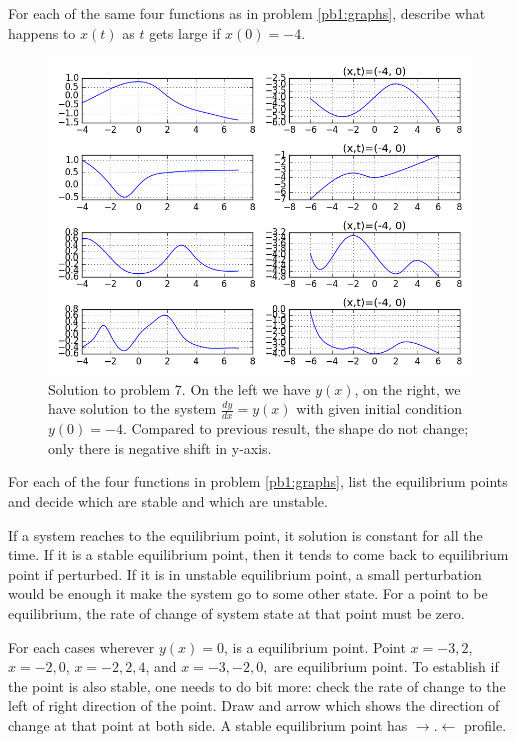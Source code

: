 \begin{questions}
\question[5]
\label{pb2:graphs}

    For each of the same four functions as in problem \ref{pb1:graphs}, describe
    what happens to $x(t)$ as $t$ gets large if $x(0) = -4 $.
    

    \begin{figure}[htpb]
        \centering
        \includegraphics[width=\linewidth]{./solve_problem8_py.png}
        \caption{Solution to problem 7. On the left we have $y(x)$, on the right, we
            have solution to the system $\frac{dy}{dx} = y(x)$  with given initial
            condition $y(0) = -4 $. Compared to previous result, the shape do not
            change; only there is negative shift in y-axis. 
        }
        \label{fig:pb2_graph}
    \end{figure}


\question[5]
For each of the four functions in problem \ref{pb1:graphs}, list the
equilibrium points and decide which are stable and which are unstable. 

\begin{solution}

    If a system reaches to the equilibrium point, it solution is constant
    for all the time. If it is a stable equilibrium point, then it tends to come
    back to equilibrium point if perturbed. If it is in unstable equilibrium point, 
    a small perturbation would be enough it make the system go to some other
    state. For a point to be equilibrium, the rate of change of system state at
    that point must be zero.

    For each cases wherever $y(x) = 0$, is a equilibrium point. Point $x=-3,2$,
    $x=-2,0$, $x = -2, 2, 4$, and $x=-3,-2,0,$ are equilibrium point. To
    establish if the point is also stable, one needs to do bit more: check the
    rate of change to the left of right direction of the point. Draw and arrow
    which shows the direction of change at that point at both side. A stable
    equilibrium point has $ \rightarrow .  \leftarrow $ profile.


\end{solution}
\end{questions}
